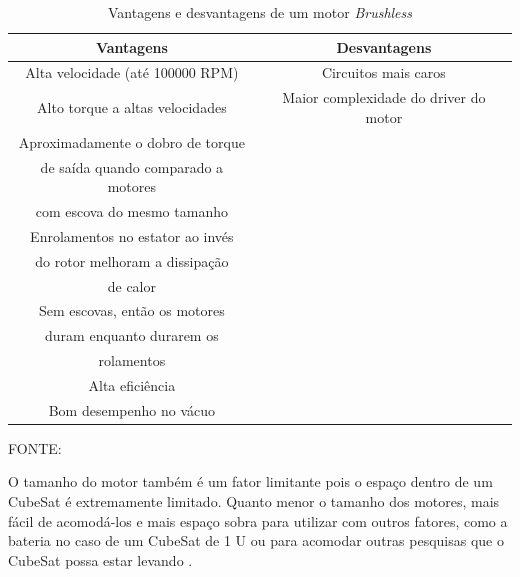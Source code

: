 \documentclass[
	12pt,				%
	openany,			%
	twoside,			%
	a4paper,			%
	english,			%
	french,				%
	spanish,			%
	brazil,				%
	oldfontcommands
	]{abntex2}
\begin{document}
\begin{table}[h]
	\caption{Vantagens e desvantagens de um motor \textit{Brushless}}
		\centering
	\begin{tabular}{|c|c|}
		\hline 
		\textbf{Vantagens} & \textbf{Desvantagens} \\ 
		\hline 
		Alta velocidade (até 100000 RPM) & Circuitos mais caros \\ 
		\hline 
		Alto torque a altas velocidades & Maior complexidade do driver do motor \\ 
		\hline 
		Aproximadamente o dobro de torque & \\
		 de saída quando comparado a motores & \\
		  com escova do mesmo tamanho &  \\ 
		\hline 
		Enrolamentos no estator ao invés & \\
		 do rotor melhoram a dissipação & \\
		  de calor & \\ 
		\hline 
		Sem escovas, então os motores & \\
		 duram enquanto durarem os & \\
		  rolamentos & \\ 
		\hline 
		Alta eficiência & \\ 
		\hline 
		Bom desempenho no vácuo & \\ 
		\hline
	\end{tabular}
	
	\begin{small}
	FONTE: \cite{Ericksson}
	\end{small}
	\label{tab:VnteDesv}
\end{table}

O tamanho do motor também é um fator limitante pois o espaço dentro de um CubeSat é extremamente limitado. Quanto menor o tamanho dos motores, mais fácil de acomodá-los e mais espaço sobra para utilizar com outros fatores, como a bateria no caso de um CubeSat de 1 U ou para acomodar outras pesquisas que o CubeSat possa estar levando \cite{Martins}.
\end{document}
